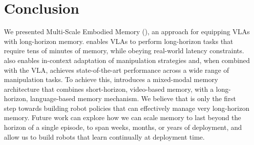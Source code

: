 \section{Conclusion}
\label{sec:conclusion}

We presented Multi-Scale Embodied Memory (\Acronym{}), an approach for equipping VLAs with long-horizon memory. \Acronym{} enables VLAs to perform long-horizon tasks that require tens of minutes of memory, while obeying real-world latency constraints. \Acronym{} also enables in-context adaptation of manipulation strategies and, when combined with the \pizerosix{} VLA, achieves state-of-the-art performance across a wide range of manipulation tasks. To achieve this, \Acronym{} introduces a mixed-modal memory architecture that combines short-horizon, video-based memory, with a long-horizon, language-based memory mechanism. 
We believe that \Acronym{} is only the first step towards building robot policies that can effectively manage very long-horizon memory. Future work can explore how we can scale memory to last beyond the horizon of a single episode, to span weeks, months, or years of deployment, and allow us to build robots that learn continually at deployment time.

